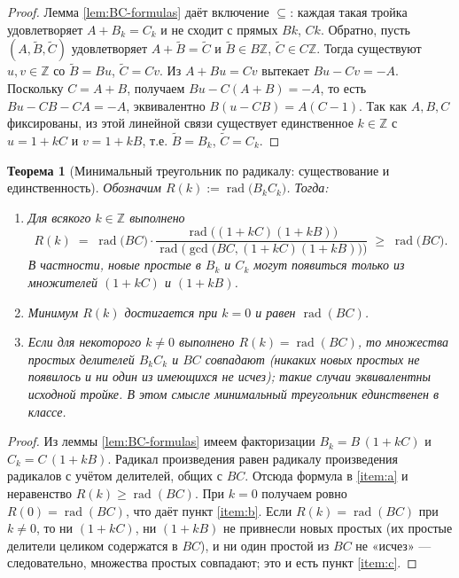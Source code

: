 \documentclass[12pt,a4paper]{article}
\newcommand{\Z}{\mathbb{Z}}
\DeclareMathOperator{\rad}{rad}
\theoremstyle{definition}
\theoremstyle{plain}
\newtheorem{theorem}[definition]{Теорема}
\theoremstyle{remark}
\begin{document}
\begin{proof}
Лемма \ref{lem:BC-formulas} даёт включение $\subseteq$: каждая такая тройка удовлетворяет $A+B_k=C_k$ и не
сходит с прямых $Bk$, $Ck$. Обратно, пусть $(A,\widetilde B,\widetilde C)$ удовлетворяет $A+\widetilde B=\widetilde C$ и
$\widetilde B\in B\Z$, $\widetilde C\in C\Z$. Тогда существуют $u,v\in\Z$ со $\widetilde B=Bu$, $\widetilde C=Cv$.
Из $A+Bu=Cv$ вытекает $Bu-Cv=-A$. Поскольку $C=A+B$, получаем $Bu-C(A+B)=-A$, то есть
$Bu-CB-C A=-A$, эквивалентно $B(u-CB)=A(C-1)$. Так как $A,B,C$ фиксированы, из этой линейной связи
существует единственное $k\in\Z$ с $u=1+kC$ и $v=1+kB$, т.е. $\widetilde B=B_k$, $\widetilde C=C_k$.
\end{proof}

\begin{theorem}[Минимальный треугольник по радикалу: существование и единственность]\label{thm:minimal-rad}
Обозначим $R(k):=\rad\!\big(B_kC_k\big)$. Тогда:
\begin{enumerate}[label=\textup{(\alph*)}]
\item \label{item:a} Для всякого $k\in\Z$ выполнено
\[
R(k)\;=\;\rad\!\big(BC\big)\cdot
\frac{\rad\!\big((1+kC)(1+kB)\big)}{\rad\!\big(\gcd\big(BC,(1+kC)(1+kB)\big)\big)}
\;\ge\;\rad\!\big(BC\big).
\]
В частности, новые простые в $B_k$ и $C_k$ могут появиться только из множителей $(1+kC)$ и $(1+kB)$.
\item \label{item:b} Минимум $R(k)$ достигается при $k=0$ и равен $\rad(BC)$.
\item \label{item:c} Если для некоторого $k\neq 0$ выполнено $R(k)=\rad(BC)$, то множества простых делителей
$B_kC_k$ и $BC$ совпадают (никаких новых простых не появилось и ни один из имеющихся не исчез);
такие случаи эквивалентны исходной тройке. В этом смысле минимальный треугольник единственен в классе.
\end{enumerate}
\end{theorem}

\begin{proof}
Из леммы \ref{lem:BC-formulas} имеем факторизации $B_k=B\,(1+kC)$ и $C_k=C\,(1+kB)$.
Радикал произведения равен радикалу произведения радикалов с учётом делителей, общих с $BC$.
Отсюда формула в \ref{item:a} и неравенство $R(k)\ge\rad(BC)$. При $k=0$ получаем ровно $R(0)=\rad(BC)$,
что даёт пункт \ref{item:b}. Если $R(k)=\rad(BC)$ при $k\neq 0$, то ни $(1+kC)$, ни $(1+kB)$
не привнесли новых простых (их простые делители целиком содержатся в $BC$), и ни один простой из $BC$
не «исчез» — следовательно, множества простых совпадают; это и есть пункт \ref{item:c}.
\end{proof}
\end{document}
